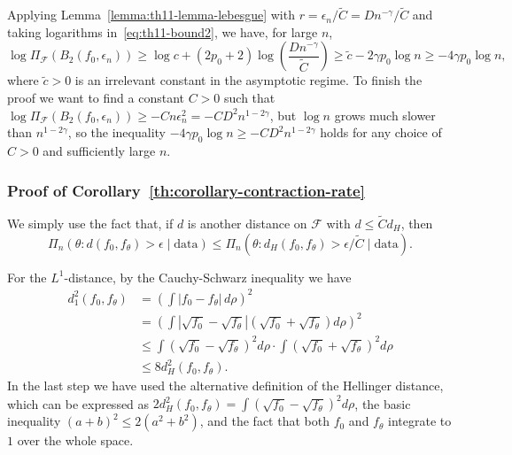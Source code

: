   Applying Lemma~\ref{lemma:th11-lemma-lebesgue} with \(r=\epsilon_n/\tilde C=Dn^{-\gamma}/\tilde C\) and taking logarithms in~\eqref{eq:th11-bound2}, we have, for large \(n\),
  \[
  \log \Pi_{\mathcal F}(B_2(f_0, \epsilon_n)) \geq \log c + (2p_0+2)\log\left(\frac{Dn^{-\gamma}}{\tilde C}\right) \geq \tilde c -2\gamma p_0\log n \geq -4\gamma p_0\log n,
  \]
where \(\tilde c > 0\) is an irrelevant constant in the asymptotic regime. To finish the proof we want to find a constant \(C>0\) such that \(\log \Pi_{\mathcal F}(B_2(f_0, \epsilon_n)) \geq - Cn\epsilon_n^2=-CD^2n^{1-2\gamma}\), but \(\log n\) grows much slower than \(n^{1-2\gamma}\), so the inequality \(-4\gamma p_0\log n \geq -CD^2n^{1-2\gamma}\) holds for any choice of \(C>0\) and sufficiently large \(n\).

\subsubsection*{Proof of Corollary~\ref{th:corollary-contraction-rate}}

We simply use the fact that, if \(d\) is another distance on \(\mathcal F\) with \(d\leq \tilde C d_H\), then
\[
  \Pi_n(\theta: d(f_0, f_\theta)>\epsilon\mid \text{data}) \leq \Pi_n(\theta: d_H(f_0, f_\theta)>\epsilon/\tilde C\mid \text{data}).
\]

For the \(L^1\)-distance, by the Cauchy-Schwarz inequality we have
\begin{align*}
  d_1^2(f_0, f_\theta) & = \left(\int |f_0 - f_\theta|\, d\rho\right)^2                                                                          \\
                       & = \left(\int \left|\sqrt{f_0} - \sqrt{f_\theta}\right|\left(\sqrt{f_0} + \sqrt{f_\theta}\right) d\rho\right)^2          \\
                       & \leq \int\left(\sqrt{f_0} - \sqrt{f_\theta}\right)^2 d\rho \cdot \int \left(\sqrt{f_0} + \sqrt{f_\theta}\right)^2 d\rho \\
                       & \leq 8 d^2_H(f_0, f_\theta).
\end{align*}
In the last step we have used the alternative definition of the Hellinger distance, which can be expressed as \(2d_H^2(f_0, f_\theta) = \int\left(\sqrt{f_0} - \sqrt{f_\theta}\right)^2 d\rho \), the basic inequality \((a + b)^2 \leq 2(a^2 + b^2)\), and the fact that both \(f_0\) and \(f_\theta\) integrate to \(1\) over the whole space.

